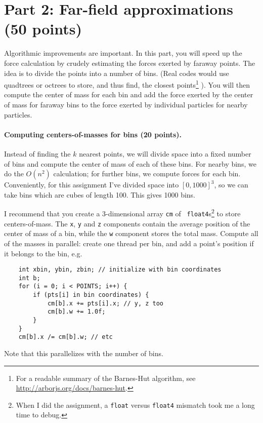 \documentclass[letterpaper,10pt]{article}
\begin{document}
\section*{Part 2: Far-field approximations (50 points)}

Algorithmic improvements are important. In this part, you will
speed up the force calculation by crudely estimating the forces
exerted by faraway points. The idea is to divide the points into a
number of bins. (Real codes would use quadtrees or octrees to store,
and thus find, the closest points\footnote{For a readable summary
of the Barnes-Hut algorithm, see \url{http://arborjs.org/docs/barnes-hut}.}
). You will then compute the center
of mass for each bin and add the force exerted by the center of mass
for faraway bins to the force exerted by individual particles for
nearby particles.

\paragraph{Computing centers-of-masses for bins (20 points).}
Instead of finding the $k$ nearest points, we will divide space into a
fixed number of bins and compute the center of mass of each of these
bins. For nearby bins, we do the $O(n^2)$ calculation; for further
bins, we compute forces for each bin. Conveniently, for this assignment
I've divided space into $[0, 1000]^3$, so we can take bins which are
cubes of length 100. This gives 1000 bins.

I recommend that you create a 3-dimensional array {\tt cm} of {\tt
  float4}s\footnote{When I did the assignment, a {\tt float} versus {\tt float4}
mismatch took me a long time to debug.} to store centers-of-mass. The {\tt x}, {\tt y} and {\tt z}
components contain the average position of the center of mass of a
bin, while the {\tt w} component stores the total mass. Compute all of
the masses in parallel: create one thread per bin, and add a point's
position if it belongs to the bin, e.g.

{\small
\begin{verbatim}
    int xbin, ybin, zbin; // initialize with bin coordinates
    int b;
    for (i = 0; i < POINTS; i++) {
        if (pts[i] in bin coordinates) {
            cm[b].x += pts[i].x; // y, z too
            cm[b].w += 1.0f;
        }
    }
    cm[b].x /= cm[b].w; // etc
\end{verbatim}
}

\noindent
Note that this parallelizes with the number of bins.
\end{document}
